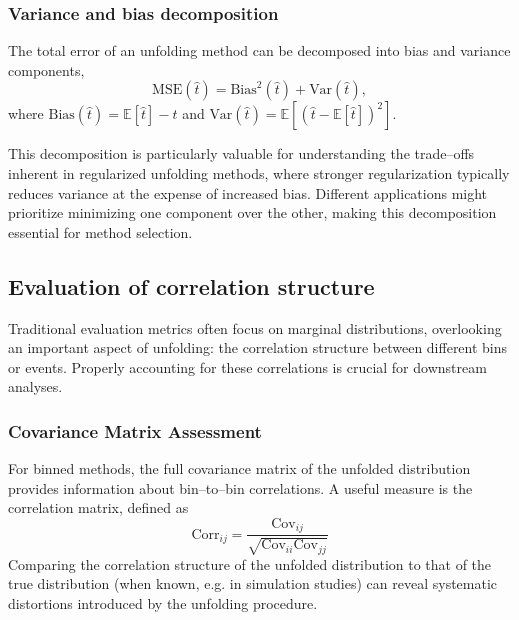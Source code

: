     \subsubsection{Variance and bias decomposition}
        The total error of an unfolding method can be decomposed into bias and variance components,
        \begin{equation}
        \text{MSE}(\hat{t}) = \text{Bias}^2(\hat{t}) + \text{Var}(\hat{t}),
        \end{equation}
        where \(\text{Bias}(\hat{t}) = \mathbb{E}[\hat{t}] - t\) and \(\text{Var}(\hat{t}) = \mathbb{E}[(\hat{t} - \mathbb{E}[\hat{t}])^2]\). 
        
        This decomposition is particularly valuable for understanding the trade--offs inherent in regularized unfolding methods, where stronger regularization typically reduces variance at the expense of increased bias.
        Different applications might prioritize minimizing one component over the other, making this decomposition essential for method selection.

    \subsection{Evaluation of correlation structure}
        Traditional evaluation metrics often focus on marginal distributions, overlooking an important aspect of unfolding: the correlation structure between different bins or events.
        Properly accounting for these correlations is crucial for downstream analyses.
        \subsubsection{Covariance Matrix Assessment}
            For binned methods, the full covariance matrix of the unfolded distribution provides information about bin--to--bin correlations.
            A useful measure is the correlation matrix, defined as
            \begin{equation}
                \text{Corr}_{ij} = \frac{\text{Cov}_{ij}}{\sqrt{\text{Cov}_{ii}\text{Cov}_{jj}}}
            \end{equation}
            Comparing the correlation structure of the unfolded distribution to that of the true distribution (when known, e.g. in simulation studies) can reveal systematic distortions introduced by the unfolding procedure.
